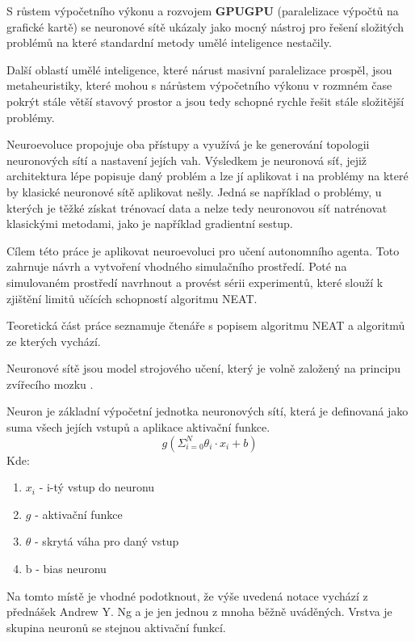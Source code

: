 S růstem výpočetního výkonu a rozvojem \textbf{GPUGPU} (paralelizace výpočtů na grafické kartě) se neuronové sítě ukázaly jako mocný nástroj pro řešení složitých problémů na které standardní metody umělé inteligence nestačily.

Další oblastí umělé inteligence, které nárust masivní paralelizace prospěl, jsou metaheuristiky, které mohou  s nárůstem výpočetního výkonu v rozmném čase pokrýt stále větší stavový prostor a jsou tedy schopné rychle řešit stále složitější problémy.


Neuroevoluce propojuje oba přístupy a využívá je ke generování topologii neuronových sítí a nastavení jejích vah. Výsledkem je neuronová síť, jejiž architektura lépe popisuje daný problém a lze jí aplikovat i na problémy na které by klasické neuronové sítě aplikovat nešly. Jedná se například o problémy, u kterých je těžké získat trénovací data a nelze tedy neuronovou síť natrénovat klasickými metodami, jako je například gradientní sestup.

Cílem této práce je aplikovat neuroevoluci pro učení autonomního agenta. Toto zahrnuje návrh a vytvoření vhodného simulačního prostředí. Poté na simulovaném prostředí navrhnout a provést sérii experimentů, které slouží k zjištění limitů učících schopností algoritmu NEAT.

Teoretická část práce seznamuje čtenáře s popisem algoritmu NEAT a algoritmů ze kterých vychází.

Neuronové sítě jsou model strojového učení, který je volně založený na principu zvířecího mozku \cite[s.~41]{fundementalsOfDeepLearning}.

Neuron je základní  výpočetní jednotka neuronových sítí, která je definovaná jako suma všech jejích vstupů a aplikace aktivační funkce.
	$$g(\Sigma_{i=0}^{N} \theta_i \cdot x_{i} + b)$$
Kde:
\begin{enumerate}
	\item $x_i$ - i-tý vstup do neuronu
	\item $g$ - aktivační funkce
	\item $\theta$ - skrytá váha pro daný vstup
	\item b - bias neuronu
\end{enumerate}
Na tomto místě je vhodné podotknout, že výše uvedená notace vychází z přednášek Andrew Y. Ng a je jen jednou z mnoha běžně uváděných.
Vrstva je skupina neuronů se stejnou aktivační funkcí. 

